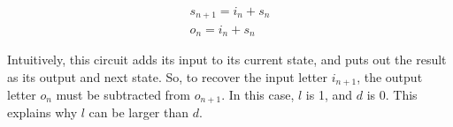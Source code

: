 \documentclass[journal]{IEEEtran}
\begin{document}
\begin{equation}
\begin{array}{c}
s_{n+1}=i_n+s_n\\
o_{n}=i_n+s_n
\end{array}
\end{equation}

Intuitively,
this circuit adds its input to its current state,
and puts out the result as its output and next state.
So,
to recover the input letter $i_{n+1}$,
the output letter $o_n$ must be subtracted from $o_{n+1}$.
In this case,
$l$ is 1,
and $d$ is 0.
This explains why $l$ can be larger than $d$.





%





%
%
\end{document}
